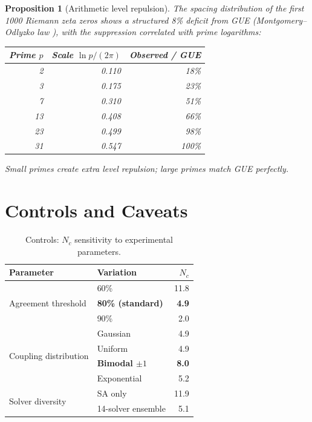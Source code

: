 \documentclass[11pt]{amsart}
\newtheorem{proposition}[theorem]{Proposition}
\theoremstyle{definition}
\begin{document}
\begin{proposition}[Arithmetic level repulsion]\label{prop:gue}
The spacing distribution of the first 1000 Riemann zeta zeros shows a structured 8\% deficit from GUE (Montgomery--Odlyzko law \cite{montgomery1973,odlyzko1987}), with the suppression correlated with prime logarithms:
\begin{center}
\begin{tabular}{r r r}
\toprule
Prime $p$ & Scale $\ln p / (2\pi)$ & Observed / GUE \\
\midrule
2 & 0.110 & 18\% \\
3 & 0.175 & 23\% \\
7 & 0.310 & 51\% \\
13 & 0.408 & 66\% \\
23 & 0.499 & 98\% \\
31 & 0.547 & 100\% \\
\bottomrule
\end{tabular}
\end{center}
Small primes create extra level repulsion; large primes match GUE perfectly.
\end{proposition}


\section{Controls and Caveats}
\label{sec:controls}

\begin{table}[ht]
\centering
\caption{Controls: $N_c$ sensitivity to experimental parameters.}
\label{tab:controls}
\begin{tabular}{l l r}
\toprule
Parameter & Variation & $N_c$ \\
\midrule
\multirow{3}{*}{Agreement threshold} & 60\% & 11.8 \\
& \textbf{80\% (standard)} & \textbf{4.9} \\
& 90\% & 2.0 \\
\midrule
\multirow{4}{*}{Coupling distribution} & Gaussian & 4.9 \\
& Uniform & 4.9 \\
& \textbf{Bimodal $\pm 1$} & \textbf{8.0} \\
& Exponential & 5.2 \\
\midrule
\multirow{2}{*}{Solver diversity} & SA only & 11.9 \\
& 14-solver ensemble & 5.1 \\
\bottomrule
\end{tabular}
\end{table}
\end{document}
